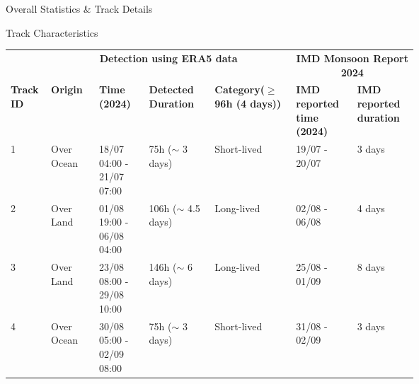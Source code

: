 \documentclass[8pt, aspectratio=169]{beamer}
\begin{document}
\begin{frame}{Overall Statistics \& Track Details}
    \vspace{-0.8cm}
    \begin{center}
        \begin{block}{Track Characteristics}
            \vspace{0.3cm}
            \centering
            \footnotesize
            \begin{tabular}{p{0.033\linewidth} p{0.085\linewidth} p{0.106\linewidth} p{0.135\linewidth} p{0.108\linewidth} p{0.107\linewidth} p{0.100\linewidth}}
                \toprule
                                  & \multicolumn{4}{c}{\textbf{Detection using ERA5 data}} & \multicolumn{2}{c}{\textbf{IMD Monsoon Report 2024}}                                                                                                                                                                   \\
                \cmidrule(lr){2-5} \cmidrule(lr){6-7}
                \textbf{Track ID} & \textbf{Origin}                                        & \textbf{Time (2024)}                                 & \textbf{Detected Duration} & \textbf{Category\footnotemark[6] \tiny{($\geq$96h (4 days))}} & \textbf{IMD reported time (2024)} & \textbf{IMD reported duration} \\
                \midrule
                1                 & Over Ocean                                             & 18/07 04:00 - 21/07 07:00                            & 75h ($\sim$ 3 days)        & Short-lived                                                   & 19/07 - 20/07                     & 3 days                         \\
                2                 & Over Land                                              & 01/08 19:00 - 06/08 04:00                            & 106h ($\sim$ 4.5 days)     & Long-lived                                                    & 02/08 - 06/08                     & 4 days                         \\
                3                 & Over Land                                              & 23/08 08:00 - 29/08 10:00                            & 146h ($\sim$ 6 days)       & Long-lived                                                    & 25/08 - 01/09                     & 8 days                         \\
                4                 & Over Ocean                                             & 30/08 05:00 - 02/09 08:00                            & 75h ($\sim$ 3 days)        & Short-lived                                                   & 31/08 - 02/09                     & 3 days                         \\

\end{tabular}
\end{block}
\end{center}
\end{frame}
\end{document}
